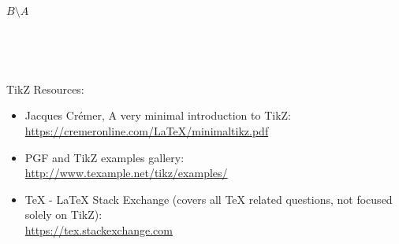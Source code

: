 \documentclass[11pt]{article}
\theoremstyle{plain}
\theoremstyle{definition}
\begin{document}
\begin{center}
\\
$B\setminus A$
\end{center}

\

\hrulefill

\

TikZ Resources:
\begin{itemize}
\item Jacques Cr\'emer, A very minimal introduction to TikZ:\\
\url{https://cremeronline.com/LaTeX/minimaltikz.pdf}
\item PGF and TikZ examples gallery:\\
\url{http://www.texample.net/tikz/examples/}
\item TeX - LaTeX Stack Exchange (covers all TeX related questions, not focused solely on TikZ):\\
\url{https://tex.stackexchange.com}
\end{itemize}
\end{document}
